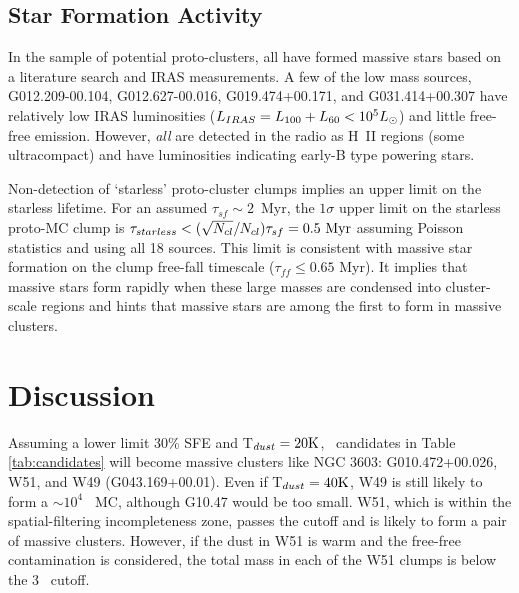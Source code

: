 \subsection{Star Formation Activity}

In the sample of potential proto-clusters, all have formed massive stars based
on a literature search and IRAS measurements.  A few of the low mass sources,
G012.209-00.104, G012.627-00.016, G019.474+00.171, and G031.414+00.307 have
relatively low IRAS luminosities ($L_{IRAS} = L_{100}+L_{60} < 10^5 L_{\odot}$) and
little free-free emission.  However, \emph{all} are detected in the radio as
H~II regions (some ultracompact) and have luminosities indicating early-B type
powering stars.

Non-detection of `starless' proto-cluster clumps implies an upper limit on the
starless lifetime. For an assumed $\tau_{sf} \sim 2$~Myr, the $1\sigma$ upper
limit on the starless proto-MC clump is $\tau_{starless} <
(\sqrt{N_{cl}}/N_{cl}) \tau_{sf} = 0.5~\mathrm{Myr}$ assuming Poisson
statistics and using all 18 sources.  This limit is consistent with massive
star formation on the clump free-fall timescale ($\tau_{ff}\leq0.65$ Myr).  It
implies that massive stars form rapidly when these large masses are condensed
into cluster-scale regions and hints that massive stars are among the first to
form in massive clusters.



\section{Discussion}
\label{sec:discussion}

Assuming a lower limit 30\% SFE and T$_{dust} = 20 {\rm K}$, \nMPC\ candidates
in Table \ref{tab:candidates}  will become massive clusters like NGC 3603:
G010.472+00.026, W51, and W49 (G043.169+00.01).  Even if  T$_{dust} = 40 {\rm
K}$, W49 is still likely to form a $\sim10^4$ \msun\ MC, although G10.47 would
be too small.  W51, which is within the spatial-filtering incompleteness zone,
passes the cutoff and is likely to form a pair of massive clusters.  However,
if the dust in W51 is warm and the free-free contamination is considered, the
total mass in each of the W51 clumps is below the 3 \msun\ cutoff.

